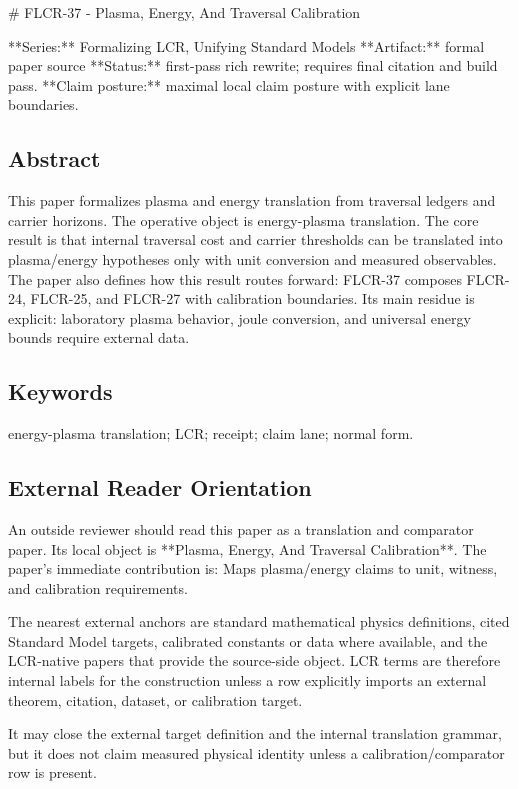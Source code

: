 \documentclass[11pt]{article}
\begin{document}
﻿\# FLCR-37 - Plasma, Energy, And Traversal Calibration

**Series:** Formalizing LCR, Unifying Standard Models
**Artifact:** formal paper source
**Status:** first-pass rich rewrite; requires final citation and build pass.
**Claim posture:** maximal local claim posture with explicit lane boundaries.

\subsection*{Abstract}

This paper formalizes plasma and energy translation from traversal ledgers and carrier horizons. The operative object is energy-plasma translation. The core result is that internal traversal cost and carrier thresholds can be translated into plasma/energy hypotheses only with unit conversion and measured observables. The paper also defines how this result routes forward: FLCR-37 composes FLCR-24, FLCR-25, and FLCR-27 with calibration boundaries. Its main residue is explicit: laboratory plasma behavior, joule conversion, and universal energy bounds require external data.

\subsection*{Keywords}

energy-plasma translation; LCR; receipt; claim lane; normal form.

\subsection*{External Reader Orientation}

An outside reviewer should read this paper as a translation and comparator paper. Its local object is **Plasma, Energy, And Traversal Calibration**. The paper's immediate contribution is: Maps plasma/energy claims to unit, witness, and calibration requirements.

The nearest external anchors are standard mathematical physics definitions, cited Standard Model targets, calibrated constants or data where available, and the LCR-native papers that provide the source-side object. LCR terms are therefore internal labels for the construction unless a row explicitly imports an external theorem, citation, dataset, or calibration target.

It may close the external target definition and the internal translation grammar, but it does not claim measured physical identity unless a calibration/comparator row is present.
\end{document}
